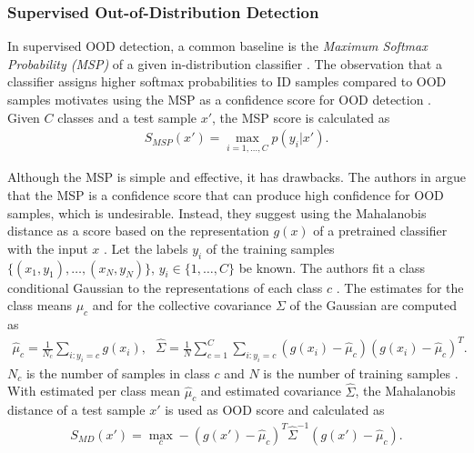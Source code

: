 \subsubsection{Supervised Out-of-Distribution Detection}
\label{section: Supervised Out-of-Distribution Detection}
In supervised OOD detection, a common baseline is the \textit{Maximum Softmax Probability (MSP)} of a given in-distribution classifier \citep{Hendrycks2016a}.
The observation that a classifier assigns higher softmax probabilities to ID samples compared to OOD samples motivates using the MSP as a confidence score for OOD detection \citep{Hendrycks2016a}.
Given $C$ classes and a test sample $x'$, the MSP score is calculated as 
\begin{align}
	S_{MSP}(x')=\max_{i=1,\dots,C}p(y_i|x').
\end{align}	
\par
Although the MSP is simple and effective, it has drawbacks.
The authors in \citep{Lee2018} argue that the MSP is a confidence score that can produce high confidence for OOD samples, which is undesirable.
Instead, they suggest using the Mahalanobis distance as a score based on the representation $g(x)$ of a pretrained classifier with the input $x$ \citep{Lee2018}.
Let the labels $y_i$ of the training samples $\{(x_1,y_1),\dots, (x_N,y_N)\}$, $y_i \in \{1,\dots,C\}$ be known.
The authors fit a class conditional Gaussian to the representations of each class $c$ \citep{Lee2018}.
The estimates for the class means $\mu_c$ and for the collective covariance $\Sigma$ of the Gaussian are computed as \citep{Lee2018}
\begin{align}
	\hat{\mu}_c = \frac{1}{N_c}\sum_{i:y_i=c}g(x_i), \hspace{8pt} \hat{\Sigma} = \frac{1}{N}\sum_{c=1}^{C}\sum_{i: y_i=c}(g(x_i)-\hat{\mu}_c)(g(x_i)-\hat{\mu}_c)^T.
\end{align}
$N_c$ is the number of samples in class $c$ and $N$ is the number of training samples \citep{Lee2018}.
With estimated per class mean $\hat{\mu}_c$ and estimated covariance $\hat{\Sigma}$, the Mahalanobis distance of a test sample $x'$ is used as OOD score and calculated as \citep{Lee2018}
\begin{align}
	S_{MD}(x') =  \max_c -(g(x')-\hat{\mu}_c)^T\hat{\Sigma}^{-1}(g(x')-\hat{\mu}_c).
\end{align}
